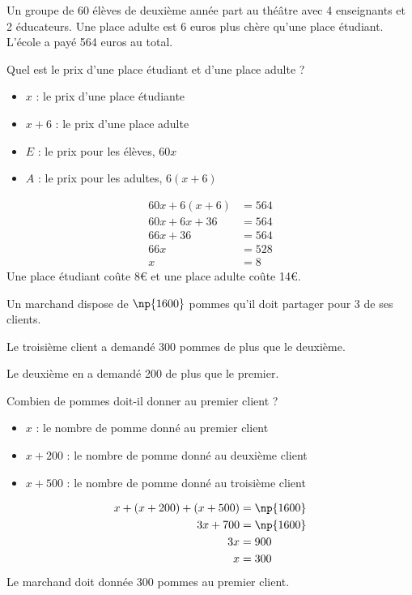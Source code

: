 \documentclass[a4paper,fontsize=12pt, parskip=half]{scrartcl}
\begin{document}
\begin{exercise}
    Un groupe de 60 élèves de deuxième année part au théâtre avec 4 enseignants
    et 2 éducateurs. Une place adulte est 6 euros plus chère qu’une place
    étudiant. L’école a payé 564 euros au total.\par
    Quel est le prix d’une place étudiant et d’une place adulte ?
\end{exercise}
\begin{solution}
    \begin{itemize}[label=\faAngleRight]
        \item $x$ : le prix d'une place étudiante
        \item $x+6$ : le prix d'une place adulte
        \item $E$ : le prix pour les élèves, $60x$
        \item $A$ : le prix pour les adultes, $6(x+6)$
    \end{itemize}
    \begin{align*}
        60x + 6(x+6)  & = 564 \\
        60x + 6x + 36 & = 564 \\
        66x + 36      & = 564 \\
        66x           & = 528 \\
        x             & = 8
    \end{align*}
    Une place étudiant coûte 8€ et une place adulte coûte 14€.
\end{solution}

\begin{exercise}
    Un marchand dispose de $\np{1600}$ pommes qu'il doit partager pour 3 de ses clients.

    Le troisième client a demandé 300 pommes de plus que le deuxième.

    Le deuxième en a demandé 200 de plus que le premier.

    Combien de pommes doit-il donner au premier client ?
\end{exercise}
\begin{solution}
    \begin{itemize}[label=\faAngleRight]
        \item $x$ : le nombre de pomme donné au premier client
        \item $x+200$ : le nombre de pomme donné au deuxième client
        \item $x+500$ : le nombre de pomme donné au troisième client
    \end{itemize}
    \begin{align*}
        x+(x+200)+(x+500) & =\np{1600}  \\
        3x + 700          & = \np{1600} \\
        3x                & = 900       \\
        x                 & = 300
    \end{align*}
    Le marchand doit donnée 300 pommes au premier client.
\end{solution}
\end{document}

